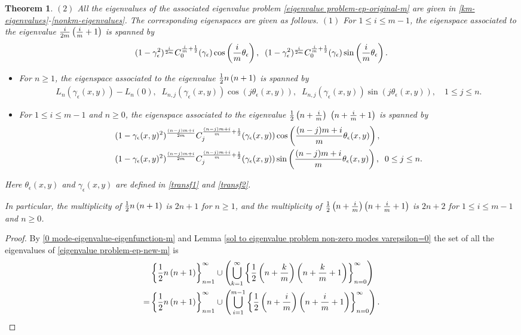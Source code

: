 \documentclass[1 [leqno, 11pt]{amsart}
\numberwithin{equation}{section}
\let\ep=\epsilon
\newtheorem{Theorem}{Theorem}[section]
\begin{document}
\begin{CJK*}{GBK}{song}
\begin{Theorem}
$(2)$
All the eigenvalues  of the associated eigenvalue problem \eqref{eigenvalue problem-ep-original-m} are
given in \eqref{km-eigenvalues}-\eqref{nonkm-eigenvalues}. The corresponding eigenspaces are given as follows.
$(1)$ For $1\leq i\leq m-1$, the  eigenspace associated to the eigenvalue  ${i\over 2m}\left({i\over m}+1\right)$ is spanned by
 \begin{align*}
 (1-\gamma_\ep^2)^{i\over2m}C_0^{{i\over m}+{1\over2}}(\gamma_\ep)\cos\left({i\over m}\theta_\ep\right),\;\;(1-\gamma_\ep^2)^{i\over2m}C_0^{{i\over m}+{1\over2}}(\gamma_\ep)\sin\left({i\over m}\theta_\ep\right).
 \end{align*}
 \fi
 \begin{itemize}
 \item For $n\geq1$,
the eigenspace associated to the eigenvalue  ${1\over2}n\left( n+1\right)$ is spanned by
 \begin{align*}
L_{n}(\gamma_\ep(x,y))-L_{n}(0),\;\; L_{n,j}(\gamma_\ep(x,y))\cos(j\theta_\ep(x,y)),\;\;
 L_{n,j}(\gamma_\ep(x,y))\sin(j\theta_\ep(x,y)), \quad  1 \leq j\leq n.
 \end{align*}
\item For $1\leq i\leq m-1$ and $n\geq0$,
the eigenspace associated to the eigenvalue  ${1\over2}\left(n+{i\over m}\right)$ $\left( n+{i\over m}+1\right)$ is spanned by
\begin{align*}
 &(1-\gamma_\ep(x,y)^2)^{(n-j)m+i\over2m}C_j^{{(n-j)m+i\over m}+{1\over2}}(\gamma_\ep(x,y))\cos\left({(n-j)m+i\over m}\theta_\ep(x,y)\right),\\
 &(1-\gamma_\ep(x,y)^2)^{(n-j)m+i\over2m}C_j^{{(n-j)m+i\over m}+{1\over2}}(\gamma_\ep(x,y))\sin\left({(n-j)m+i\over m}\theta_\ep(x,y)\right),\;\;0\leq j\leq n.
 \end{align*}
 \end{itemize}
Here $\theta_\ep(x,y)$ and  $\gamma_\ep(x,y)$ are defined in \eqref{transf1} and \eqref{transf2}.

 In particular,
the multiplicity of $ {1\over2}n\left(n+1\right)$ is $2n+1$ for  $n\geq1$, and the multiplicity of
${1\over2}\left(n+{i\over m}\right)\left( n+{i\over m}+1\right)$ is $2n+2$ for $ 1\leq i\leq m-1$ and  $n\geq0$.
\end{Theorem}
\begin{proof}
By
\eqref{0 mode-eigenvalue-eigenfunction-m} and Lemma \ref{sol to eigenvalue problem non-zero modes varepsilon=0}  the set of all the eigenvalues of \eqref{eigenvalue problem-ep-new-m} is
\begin{align*}
&\left\{{1\over2}n\left(n+1\right)\right\}_{n=1}^\infty\cup\left(\bigcup_{k=1}^\infty\left\{{1\over2}\left(n+{k\over m}\right)\left(n+{k\over m} +1\right)\right\}_{n=0}^\infty\right)\\
=&\left\{{1\over2}n\left(n+1\right)\right\}_{n=1}^\infty\cup
\left(\bigcup_{i=1}^{m-1}\left\{{1\over2}\left(n+{i\over m}\right)\left(n+{i\over m} +1\right)\right\}_{n=0}^\infty\right).
\end{align*}


\end{proof}
\end{CJK*}
\end{document}
